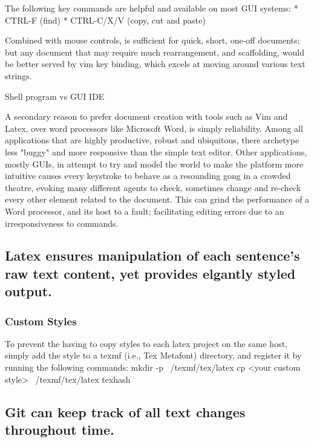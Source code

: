 \documentclass{article}
\begin{document}
The following key commands are helpful and available on most GUI systems:
* CTRL-F (find)
* CTRL-C/X/V (copy, cut and paste)

Combined with mouse controls, is sufficient for quick, short, one-off documents; but any document that may require much rearrangement, and scaffolding, would be better served by vim key binding, which excels at moving around various text strings.

Shell program vs GUI IDE


A secondary reason to prefer document creation with tools such as Vim and Latex, over word processors like Microsoft Word, is simply reliability.  Among all applications that are highly productive, robust and ubiquitous, there archetype less "buggy" and more responsive than the simple text editor.  Other applications, mostly GUIs, in attempt to try and model the world to make the platform more intuitive causes every keystroke to behave as a resounding gong in a crowded theatre, evoking many different agents to check, sometimes change and re-check every other element related to the document.  This can grind the performance of a Word processor, and its host to a fault; facilitating editing errors due to an irresponsiveness to commands. 

\subsection{Latex ensures manipulation of each sentence's raw text content, yet provides elgantly styled output.}
\subsubsection{Custom Styles}
To prevent the having to copy styles to each latex project on the same host, simply add the style to a texmf (i.e., Tex Metafont) directory, and register it by running the following commands:
mkdir -p ~/texmf/tex/latex
cp <your custom style> ~/texmf/tex/latex
texhash


\subsection{Git can keep track of all text changes throughout time.} 
\end{document}
